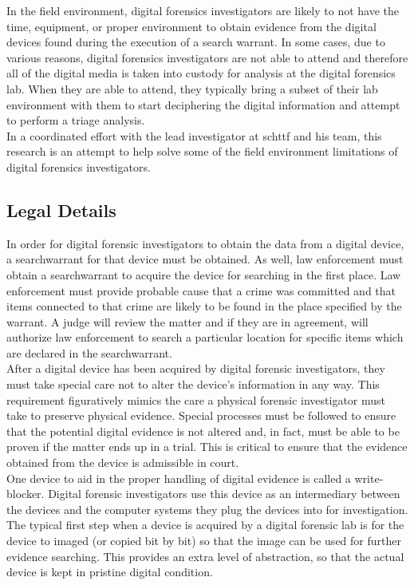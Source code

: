 \documentclass[12pt]{article}
\begin{document}
In the field environment, digital forensics
investigators are likely to not have the time, equipment, or proper environment to
obtain evidence from the digital devices found during the execution of a search
warrant.  In some cases, due to various reasons, digital forensics investigators
are not able to attend and therefore all of the digital media is taken into
custody for analysis at the digital forensics lab.  When they are able to attend,
they typically
bring a subset of their lab environment with them to start deciphering
the digital information and attempt to perform a triage analysis.\\

In a coordinated effort with the lead investigator at \gls{schttf} and his team,
this research is an attempt to help solve some of the field environment limitations
of digital forensics investigators.

\subsection{Legal Details}
In order for digital forensic investigators to obtain the data from a digital device,
a \gls{searchwarrant} for that device must be obtained.  As well, law enforcement must
obtain a \gls{searchwarrant} to acquire the device for searching in the first place.
Law enforcement must provide probable cause that a crime 
was committed and that items connected to that crime are likely to be found 
in the place specified by the warrant.  A judge will review the matter and if
they are in agreement, will authorize law enforcement to search a particular location
for specific items which are declared in the \gls{searchwarrant}.\\

After a digital device has been acquired by digital forensic investigators, they
must take special care not to alter the device's information in any way.  This 
requirement figuratively mimics the care a physical forensic investigator must
take to preserve physical evidence.  Special processes must be followed to ensure
that the potential digital evidence is not altered and, in fact, must be able to 
be proven if the matter ends up in a trial.  This is critical to ensure that the
evidence obtained from the device is admissible in court.\\

One device to aid in the proper handling of digital evidence is called a
write-blocker.  Digital forensic investigators use this device as an intermediary
between the devices and the computer systems they plug the devices into for
investigation.  The typical first step when a device is acquired by a digital
forensic lab is for the device to imaged (or copied bit by bit) so that the
image can be used for further evidence searching.  This provides an extra level of
abstraction, so that the actual device is kept in pristine digital condition.\\
\end{document}
